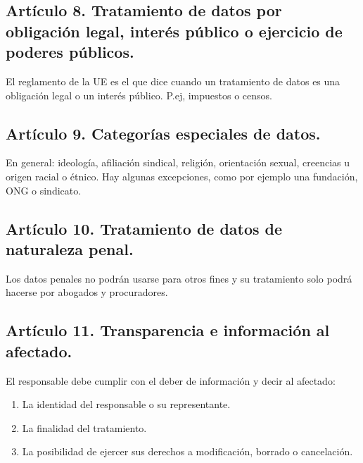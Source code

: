 \documentclass[letterpaper,10pt,spanish]{sphinxmanual}
\begin{document}
\subsection{Artículo 8. Tratamiento de datos por obligación legal, interés público o ejercicio de poderes públicos.}
\label{\detokenize{tema_lopd/tema_lopd:articulo-8-tratamiento-de-datos-por-obligacion-legal-interes-publico-o-ejercicio-de-poderes-publicos}}
El reglamento de la UE es el que dice cuando un tratamiento de datos es una obligación legal o un interés público. P.ej, impuestos o censos.


\subsection{Artículo 9. Categorías especiales de datos.}
\label{\detokenize{tema_lopd/tema_lopd:articulo-9-categorias-especiales-de-datos}}
En general: ideología, afiliación sindical, religión, orientación sexual, creencias u origen racial o étnico. Hay algunas excepciones, como por ejemplo una fundación, ONG o sindicato.


\subsection{Artículo 10. Tratamiento de datos de naturaleza penal.}
\label{\detokenize{tema_lopd/tema_lopd:articulo-10-tratamiento-de-datos-de-naturaleza-penal}}
Los datos penales no podrán usarse para otros fines y su tratamiento solo podrá hacerse por abogados y procuradores.


\subsection{Artículo 11. Transparencia e información al afectado.}
\label{\detokenize{tema_lopd/tema_lopd:articulo-11-transparencia-e-informacion-al-afectado}}
El responsable debe cumplir con el deber de información y decir al afectado:
\begin{enumerate}
%
\item {} 
La identidad del responsable o su representante.

\item {} 
La finalidad del tratamiento.

\item {} 
La posibilidad de ejercer sus derechos a modificación, borrado o cancelación.

\end{enumerate}
\end{document}
